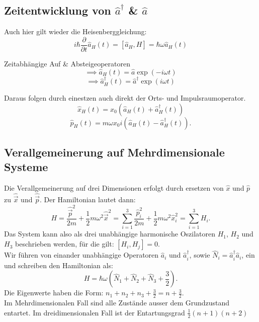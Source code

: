 \documentclass{report}
\begin{document}
\subsection{Zeitentwicklung von $\hat{a}^\dagger$ \& $\hat{a}$ }
Auch hier gilt wieder die Heisenberggleichung: \[
	i \hbar \frac{\partial}{\partial t} \hat{a}_H(t) = [\hat{a}_H, H] = \hbar \omega \hat{a}_H(t)
\] 
\begin{redbox}{Zeitabhängige Auf \& Absteigeoperatoren}
\[
\implies \hat{a}_H(t) = \hat{a} \exp(-i\omega t)
\] \[
\implies \hat{a}^\dagger_H(t) = \hat{a}^\dagger \exp(i \omega t)
\]  
\end{redbox}
Daraus folgen durch einestzen auch direkt der Orts- und Impulsraumoperator. \[
	\hat{x}_H(t) = x_0 (\hat{a}_H(t) + \hat{a}_H^\dagger(t) )
\] \[
\hat{p}_H(t) = m\omega x_0 i (\hat{a}_H(t) - \hat{a}_H^\dagger(t))
.\]  
\subsection{Verallgemeinerung auf Mehrdimensionale Systeme}
Die Verallgemeinerung auf drei Dimensionen erfolgt durch ersetzen von $\hat{x}$ und $\hat{p}$ zu $\hat{\vec{x}}$ und $\hat{\vec{p}}$. Der Hamiltonian lautet dann: \[
	H = \frac{\hat{\vec{p}}^2}{2m} + \frac{1}{2} m \omega^2 \hat{\vec{x}}^2 = \sum_{i=1}^{3} \frac{\hat{p}_i^2}{2m} + \frac{1}{2} m \omega^2 \hat{x}_i^2 = \sum_{i = 1}^{3} H_i 
.\] Das System kann also als drei unabhängige harmonische Oszilatoren $H_1$, $H_2$ und $H_3$ beschrieben werden, für die gilt: $[H_i, H_j] = 0$.\\
Wir führen von einander unabhängige Operatoren $\hat{a}_i$ und $\hat{a}_i^\dagger$, sowie $\hat{N}_i = \hat{a}_i^\dagger \hat{a}_i$, ein und schreiben den Hamiltonian als: \[
	H = \hbar \omega (\hat{N}_1 + \hat{N}_2 + \hat{N}_3 + \frac{3}{2})
.\] Die Eigenwerte haben die Form: $n_1+n_2+n_3+\frac{3}{2} = n + \frac{3}{2}$. \\
Im Mehrdimensionalen Fall sind alle Zustände ausser dem Grundzustand entartet. Im dreidimensionalen Fall ist der Entartungsgrad $\frac{1}{2}(n+1)(n+2)$
\end{document}
